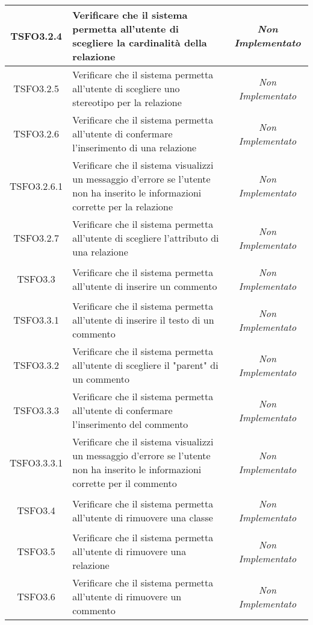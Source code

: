 \begin{longtable}{|c|>{}m{8cm}|c|}
\hypertarget{TSFO3.2.4}{TSFO3.2.4} & Verificare che il sistema permetta all'utente di scegliere la cardinalità della relazione & \textit{Non Implementato}\\ \hline
\hypertarget{TSFO3.2.5}{TSFO3.2.5} & Verificare che il sistema permetta all'utente di scegliere uno stereotipo per la relazione & \textit{Non Implementato}\\ \hline
\hypertarget{TSFO3.2.6}{TSFO3.2.6} & Verificare che il sistema permetta all'utente di confermare l'inserimento di una relazione & \textit{Non Implementato}\\ \hline
\hypertarget{TSFO3.2.6.1}{TSFO3.2.6.1} & Verificare che il sistema visualizzi un messaggio d'errore se l'utente non ha inserito le informazioni corrette per la relazione & \textit{Non Implementato}\\ \hline
\hypertarget{TSFO3.2.7}{TSFO3.2.7} & Verificare che il sistema permetta all'utente di scegliere l'attributo di una relazione & \textit{Non Implementato}\\ \hline
\hypertarget{TSFO3.3}{TSFO3.3} & Verificare che il sistema permetta all'utente di inserire un commento & \textit{Non Implementato}\\ \hline
\hypertarget{TSFO3.3.1}{TSFO3.3.1} & Verificare che il sistema permetta all'utente di inserire il testo di un commento & \textit{Non Implementato}\\ \hline
\hypertarget{TSFO3.3.2}{TSFO3.3.2} & Verificare che il sistema permetta all'utente di scegliere il "parent" di un commento & \textit{Non Implementato}\\ \hline
\hypertarget{TSFO3.3.3}{TSFO3.3.3} & Verificare che il sistema permetta all'utente di confermare l'inserimento del commento & \textit{Non Implementato}\\ \hline
\hypertarget{TSFO3.3.3.1}{TSFO3.3.3.1} & Verificare che il sistema visualizzi un messaggio d'errore se l'utente non ha inserito le informazioni corrette per il commento & \textit{Non Implementato}\\ \hline
\hypertarget{TSFO3.4}{TSFO3.4} & Verificare che il sistema permetta all'utente di rimuovere una classe & \textit{Non Implementato}\\ \hline
\hypertarget{TSFO3.5}{TSFO3.5} & Verificare che il sistema permetta all'utente di rimuovere una relazione & \textit{Non Implementato}\\ \hline
\hypertarget{TSFO3.6}{TSFO3.6} & Verificare che il sistema permetta all'utente di rimuovere un commento & \textit{Non Implementato}\\ \hline

\end{longtable}

